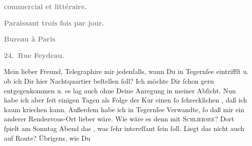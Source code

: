 \begin{ledgroupsized}[t]{13cm}
           \pstart
           \begin{otherlanguage}{french}\textcolor{gray}{\textbf{commercial et littéraire.}}\end{otherlanguage}\pend
           \pstart
           \begin{otherlanguage}{french}\textcolor{gray}{\textbf{\textbf{Paraissant trois fois par jour.}}}\end{otherlanguage}\pend
           \pstart
           \begin{otherlanguage}{french}\textcolor{gray}{\textbf{\textbf{Bureau à Paris}}}\end{otherlanguage}\pend
           \pstart
           \begin{otherlanguage}{french}\textcolor{gray}{\textbf{\textbf{24. Rue Feydeau.}}}\end{otherlanguage}\pend
           \pstart\center{}Mein lieber Freund,\pend\pstart
           Telegraphire mir jedenſalls, \strikeout{\textcolor{gray}{ob}} wann Du in Tegernſee eintriffſt u. ob
               ich Dir hier Nachtquartier beſtellen ſoll? Ich möchte Dir ſchon gern entgegenkommen
               u. es lag auch ohne Deine Anregung in meiner Abſicht. Nun habe ich aber ſeit einigen
               Tagen als Folge der Kur einen ſo ſchrecklichen \label{K_L02746-1v}\label{K_L02746-1h}, daß ich kaum kriechen kann. Außerdem habe
               ich in Tegernſee Verwandte, ſo daß mir ein
               anderer Rendezvous-Ort lieber wäre. Wie wäre es denn mit \textsc{Schliersee}? Dort {\pb}ſpielt am Sonntag{ }Abend das \label{K_L02746-2v}\label{K_L02746-2h}, was ſehr intereſſant ſein ſoll. Liegt das nicht auch auf \label{K_L02746-3v}\label{K_L02746-3h} Route? Übrigens, wie Du

\end{ledgroupsized}
